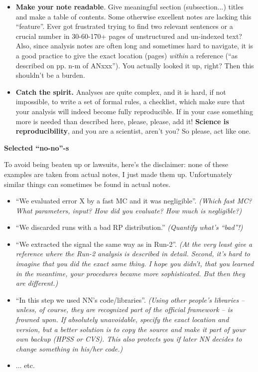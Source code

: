 \documentclass[12pt]{article}
\begin{document}
\begin{itemize}
{  just finished your analysis on time to meet a deadline but for
  approval you still have to submit an analysis note...}
\item{{\bf Make your note readable}.  
  Give meaningful section (subsection...) titles and
  make a table of contents.  Some otherwise excellent notes are
  lacking this ``feature''.  Ever got frustrated trying to find two
  relevant sentences or a crucial number in 30-60-170+ pages of
  unstructured and un-indexed text? 
  Also, since analysis notes are often long and sometimes hard to
  navigate, it is a good practice to give the exact location (pages)
  {\it  within} a reference (``as described on pp. n-m of ANxxx'').
  You actually looked it up, right?  Then this shouldn't be a burden.}
\item{{\bf Catch the spirit.}  Analyses are quite complex, and it is
  hard, if not impossible, to write a set of formal rules, a
  checklist, which make sure that your analysis will indeed become
  fully reproducible.  If in your case something more is needed than
  described here, please, please, add it!  {\bf Science is
    reproducibility}, and you are a scientist, aren't you?  So please,
  act like one.}

\end{itemize}


\vspace{1.0in}
{\bf Selected ``no-no''-s}

To avoid being beaten up or lawsuits, here's the disclaimer: none of
these examples are taken from actual notes, I just made them up.
Unfortunately similar things can sometimes be found in actual notes.

\begin{itemize}
\item{``We evaluated error X by a fast MC and it was negligible''.
  {\it (Which fast MC?  What parameters, input? How did you 
    evaluate?  How much is negligible?)}}
\item{``We discarded runs with a bad RP distribution.'' 
  {\it (Quantify what's ``bad''!)}}
\item{``We extracted the signal the same way as in Run-2''.
  {\it (At the very least give a reference where the Run-2 analysis is
  described in detail.  Second, it's hard to imagine that you did the
  exact same thing.  I hope you didn't, that you learned in the
  meantime, your procedures became more sophisticated.  But then they
  are different.)}}
\item{``In this step we used NN's code/libraries''.  {\it (Using other
  people's libraries -- unless, of course, they are recognized part of
  the official framework -- is frowned upon.  If absolutely
  unavoidable, specify the exact location and version, but a better
  solution is to copy the source and make it part of your own backup
  (HPSS or CVS).  This also protects you if later NN decides to change
  something in his/her code.)}}
\item{... etc.}

\end{itemize}
\end{document}
